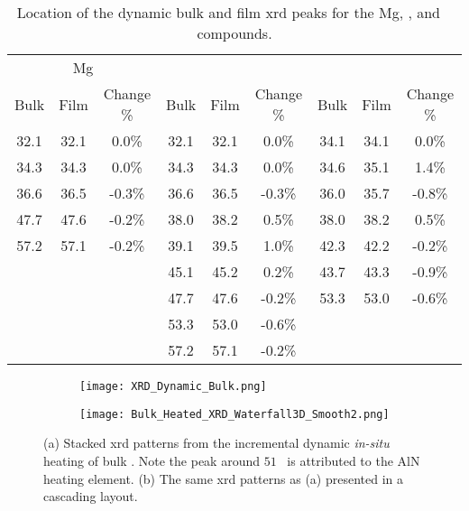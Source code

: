 \documentclass[draft,a4paper,12pt,oneside]{article}%
\begin{document}
\begin{table}[h]
	\centering
	\caption{Location of the dynamic bulk and film \acrshort{xrd} peaks for the Mg, \MgZn, and \CaMgZnFive~ compounds.}
	\begin{tabular}{ c c c c c c c c c }
		\toprule
		\multicolumn{3}{c}{Mg} & \multicolumn{3}{c}{\MgZn} & \multicolumn{3}{c}{\CaMgZnFive} \\
		Bulk & Film & Change \% & Bulk & Film & Change \% & Bulk & Film & Change \% \\
		\midrule
		32.1 & 32.1 & 0.0\%  & 32.1 & 32.1   & 0.0\%  & 34.1 & 34.1 & 0.0\% \\
		34.3 & 34.3 & 0.0\%  & 34.3 & 34.3   & 0.0\%  & 34.6 & 35.1 & 1.4\% \\
		36.6 & 36.5 & -0.3\% & 36.6 & 36.5   & -0.3\% & 36.0 & 35.7 & -0.8\% \\
		47.7 & 47.6 & -0.2\% & 38.0 & 38.2   & 0.5\%  & 38.0 & 38.2 & 0.5\% \\
		57.2 & 57.1 & -0.2\% & 39.1 & 39.5   & 1.0\%  & 42.3 & 42.2 & -0.2\% \\
		&    &      & 45.1   & 45.2 & 0.2\%  & 43.7   & 43.3 & -0.9\% \\
		&    &      & 47.7   & 47.6 & -0.2\% & 53.3   & 53.0 & -0.6\% \\
		&    &      & 53.3   & 53.0 & -0.6\% &        &      &        \\
		&    &      & 57.2   & 57.1 & -0.2\% &        &      &        \\
		\bottomrule
	\end{tabular}
	\label{tab:Dynamic_XRD_PeakShift}
\end{table}

\begin{figure}[b]
	\centering
	\begin{subfigure}[htbp]{0.75\textwidth}
		\texttt{[image: XRD\_Dynamic\_Bulk.png]}
		\caption{}
		\label{fig:XRD_Dynamic_FullStack_Bulk}
	\end{subfigure}
	\begin{subfigure}[htbp]{0.75\textwidth}
		\texttt{[image: Bulk\_Heated\_XRD\_Waterfall3D\_Smooth2.png]}
		\caption{}
		\label{fig:XRD_Dynamic_WaterFall_Bulk}
	\end{subfigure}
	\caption{(a) Stacked \acrshort{xrd} patterns from the incremental dynamic \textit{in-situ} heating of bulk \MgZnCa. Note the peak around $51$\degree~ is attributed to the AlN heating element. (b) The same \acrshort{xrd} patterns as (a) presented in a cascading layout.}%
	\label{fig:XRD_Dynamic_Bulk}
\end{figure}
\end{document}
